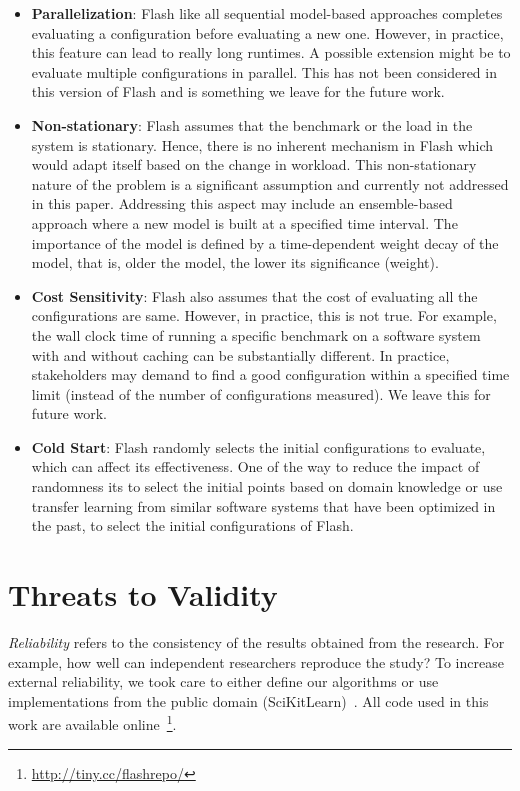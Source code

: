 \documentclass[10pt,journal,compsoc]{IEEEtran}
\newcommand{\flash}{{\sc Flash}\xspace}
\begin{document}
\begin{itemize}[leftmargin=*]
    \item \textbf{Parallelization}:  \flash like all sequential model-based approaches completes evaluating a configuration before evaluating a new one. However, in practice, this feature can lead to really long runtimes. A possible extension might be to evaluate multiple configurations in parallel. This has not been considered in this version of \flash and is something we leave for the future work.
    
    \item  \textbf{Non-stationary}: \flash assumes that the benchmark or the load in the system is stationary. Hence, there is no inherent mechanism in \flash which would adapt itself based on the change in workload. This non-stationary nature of the problem is a significant assumption and currently not addressed in this paper. Addressing this aspect may include an ensemble-based approach where a new model is built at a specified time interval. The importance of the model is defined by a time-dependent weight decay of the model, that is, older the model, the lower its significance (weight).
    
    \item \textbf{Cost Sensitivity}: \flash also assumes that the cost of evaluating all the configurations are same. However, in practice, this is not true. For example, the wall clock time of running a specific benchmark on a software system with and without caching can be substantially different. In practice, stakeholders may demand to find a good configuration within a specified time limit (instead of the number of configurations measured). We leave this for future work.
    
    \item \textbf{Cold Start}: \flash randomly selects the initial configurations to evaluate, which can affect its effectiveness. One of the way to reduce the impact of randomness its to select the initial points based on domain knowledge or use transfer learning from similar software systems that have been optimized in the past, to select the initial configurations of \flash.
\end{itemize} 


\section{Threats to Validity}
{\em Reliability} refers to the consistency of the results obtained
from the research.  For example,   how well can independent researchers reproduce the study? To increase external
reliability, we took care to either  define our
algorithms or use implementations from the public domain
(SciKitLearn)~\cite{scikit-learn}. All code used in this work are available
online~\footnote{\url{http://tiny.cc/flashrepo/}}.
\end{document}

